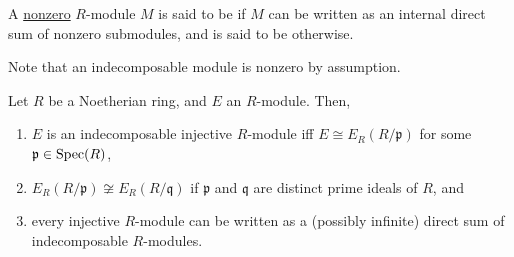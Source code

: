 \begin{defn}
	A \underline{nonzero} $R$-module $M$ is said to be  if $M$ can be written as an internal direct sum of nonzero submodules, and is said to be  otherwise.
\end{defn}

Note that an indecomposable module is nonzero by assumption.

\begin{thm}[Matlis] \label{thm:matlis-injectives-over-noetherian}
	Let $R$ be a Noetherian ring, and $E$ an $R$-module. Then,
	\begin{enumerate}
		\item $E$ is an indecomposable injective $R$-module iff $E \cong E_{R}(R/\mathfrak{p})$ for some $\mathfrak{p} \in \operatorname{Spec}(R)$, 
		\item $E_{R}(R/\mathfrak{p}) \not\cong E_{R}(R/\mathfrak{q})$ if $\mathfrak{p}$ and $\mathfrak{q}$ are distinct prime ideals of $R$, and
		\item every injective $R$-module can be written as a (possibly infinite) direct sum of indecomposable $R$-modules.
	\end{enumerate}
\end{thm}
